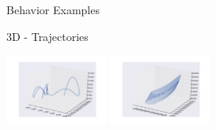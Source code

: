 \documentclass{beamer}
\begin{document}
\begin{frame}[allowframebreaks]{Behavior Examples}
\begin{minipage}{\textwidth}
\begin{block}{3D - Trajectories}
\begin{center}
\includegraphics[width=0.25\textwidth]{../Figures/Behaviors/12.pdf}
\includegraphics[width=0.25\textwidth]{../Figures/Behaviors/13.pdf}
\end{center}
\end{block}
\end{minipage}


\end{frame}
\end{document}
